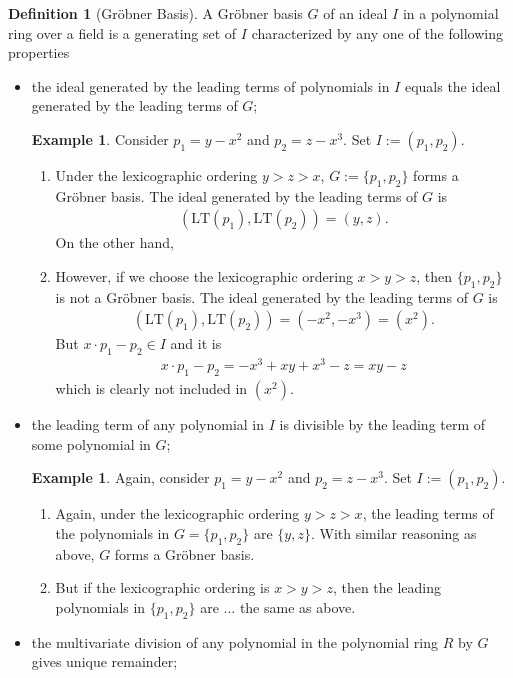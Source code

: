 \documentclass{book}
\theoremstyle{plain}
\theoremstyle{definition}
\newtheorem{exmp}[thm]{Example} %
\theoremstyle{custom_definition}
\newtheorem{defn}[thm]{Definition}
\begin{document}
\begin{defn}[Gröbner Basis]
A Gröbner basis \(G\) of an ideal \(I\) in a polynomial ring over a field is a generating set of \(I\) characterized by any one of the following properties
\begin{itemize}
    \item the ideal generated by the leading terms of polynomials in \(I\) equals the ideal generated by the leading terms of \(G\);
    \begin{exmp}
        Consider \(p_1 = y - x^2\) and \(p_2 = z - x^3\). Set \(I := (p_1, p_2)\).
        \begin{enumerate}
            \item Under the lexicographic ordering \(y > z > x\), \(G := \{p_1, p_2\}\) forms a Gröbner basis. The ideal generated by the leading terms of \(G\) is
            \begin{align}
                (\mathrm{LT}(p_1), \mathrm{LT}(p_2)) = (y, z) \text{.}
            \end{align}
            On the other hand, %
            \item However, if we choose the lexicographic ordering \(x > y > z\), then \(\{p_1, p_2\}\) is not a Gröbner basis. The ideal generated by the leading terms of \(G\) is
            \begin{align}
                (\mathrm{LT}(p_1), \mathrm{LT}(p_2)) = (-x^2, -x^3) = (x^2) \text{.}
            \end{align}
            But \(x \cdot p_1 - p_2 \in I\) and it is
            \begin{align}
                x \cdot p_1 - p_2 = -x^3 + xy + x^3 - z = xy - z
            \end{align}
            which is clearly not included in \((x^2)\).
        \end{enumerate}
    \end{exmp}
    \item the leading term of any polynomial in \(I\) is divisible by the leading term of some polynomial in \(G\);
    \begin{exmp}
        Again, consider \(p_1 = y - x^2\) and \(p_2 = z - x^3\). Set \(I := (p_1, p_2)\).
        \begin{enumerate}
            \item Again, under the lexicographic ordering \(y > z > x\), the leading terms of the polynomials in \(G = \{p_1, p_2\}\) are \(\{y, z\}\). With similar reasoning as above, \(G\) forms a Gröbner basis.
            \item But if the lexicographic ordering is \(x > y > z\), then the leading polynomials in \(\{p_1, p_2\}\) are ... the same as above.
        \end{enumerate}
    \end{exmp}
    \item the multivariate division of any polynomial in the polynomial ring \(R\) by \(G\) gives unique remainder;
\end{itemize}
\end{defn}
\end{document}
